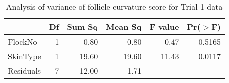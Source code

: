 \begin{table}[ht]
\centering
\caption{Analysis of variance of follicle curvature score for Trial 1 data}
\label{tab:curvaov}
\begin{tabular}{lrrrrr}
  \hline
 & Df & Sum Sq & Mean Sq & F value & Pr($>$F) \\ 
  \hline
FlockNo & 1 & 0.80 & 0.80 & 0.47 & 0.5165 \\ 
  SkinType & 1 & 19.60 & 19.60 & 11.43 & 0.0117 \\ 
  Residuals & 7 & 12.00 & 1.71 &  &  \\ 
   \hline
\end{tabular}
\end{table}

